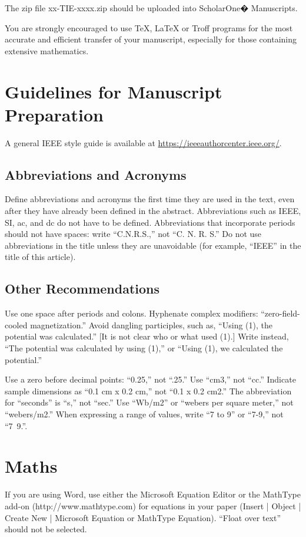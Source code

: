 \documentclass[journal]{IEEEtranTICPS}
\begin{document}
The zip file xx-TIE-xxxx.zip should be uploaded into ScholarOne� Manuscripts.

You are strongly encouraged to use TeX, LaTeX or Troff programs for the most accurate and efficient transfer of your manuscript, especially for those containing extensive mathematics.


\section{Guidelines for Manuscript Preparation}
A general IEEE style guide is available at \url{https://ieeeauthorcenter.ieee.org/}.

\subsection{Abbreviations and Acronyms}
Define abbreviations and acronyms the first time they are used in the text, even after they have already been defined in the abstract. Abbreviations such as IEEE, SI, ac, and dc do not have to be defined. Abbreviations that incorporate periods should not have spaces: write ``C.N.R.S.,'' not ``C. N. R. S.'' Do not use abbreviations in the title unless they are unavoidable (for example, ``IEEE'' in the title of this article).	

\subsection{Other Recommendations}
Use one space after periods and colons. Hyphenate complex modifiers: ``zero-field-cooled magnetization.'' Avoid dangling participles, such as, ``Using (1), the potential was calculated.'' [It is not clear who or what used (1).] Write instead, ``The potential was calculated by using (1),'' or ``Using (1), we calculated the potential.''

Use a zero before decimal points: ``0.25,'' not ``.25.'' Use ``cm3,'' not ``cc.'' Indicate sample dimensions as ``0.1 cm x 0.2 cm,'' not ``0.1 x 0.2 cm2.'' The abbreviation for ``seconds'' is ``s,'' not ``sec.'' Use ``Wb/m2'' or ``webers per square meter,'' not ``webers/m2.'' When expressing a range of values, write ``7 to 9'' or ``7-9,'' not ``7~9.''.

\section{Maths}

If you are using Word, use either the Microsoft Equation Editor or the MathType add-on (http://www.mathtype.com) for equations in your paper (Insert | Object | Create New | Microsoft Equation or MathType Equation). ``Float over text'' should not be selected.
\end{document}
